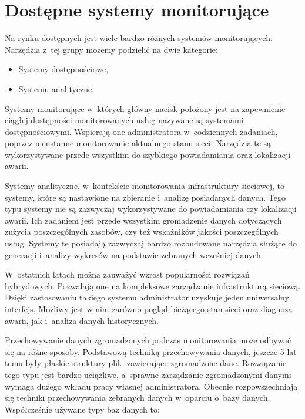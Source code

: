\chapter{Dostępne systemy monitorujące}
\label{chap:Systemy}

Na rynku dostępnych jest wiele bardzo różnych systemów
monitorujących. Narzędzia z~tej grupy możemy podzielić na dwie
kategorie:

\begin{itemize}
\item Systemy dostępnościowe,
\item Systemu analityczne.
\end{itemize}

Systemy monitorujące w~których główny nacisk położony jest na
zapewnienie ciągłej dostępności monitorowanych usług nazywane są
systemami dostępnościowymi. Wspierają one administratora
w~codziennych zadaniach, poprzez nieustanne monitorowanie aktualnego
stanu sieci. Narzędzia te są wykorzystywane przede wszystkim do
szybkiego powiadamiania oraz lokalizacji awarii.

Systemy analityczne, w~kontekście monitorowania infrastruktury
sieciowej, to systemy, które są nastawione na zbieranie i~analizę
posiadanych danych. Tego typu systemy nie są zazwyczaj wykorzystywane
do powiadamiania czy lokalizacji awarii. Ich zadaniem jest przede
wszystkim gromadzenie danych dotyczących zużycia poszczególnych
zasobów, czy też wskaźników jakości poszczególnych usług. Systemy te
posiadają zazwyczaj bardzo rozbudowane narzędzia służące do generacji
i~analizy wykresów na podstawie zebranych wcześniej danych.

W~ostatnich latach można zauważyć wzrost popularności rozwiązań
hybrydowych. Pozwalają one na kompleksowe zarządzanie infrastrukturą
sieciową. Dzięki zastosowaniu takiego systemu administrator uzyskuje
jeden uniwersalny interfejs. Możliwy jest w nim zarówno pogląd
bieżącego stan sieci oraz diagnoza awarii, jak i~analiza danych
historycznych.

Przechowywanie danych zgromadzonych podczas monitorowania może odbywać
się na różne sposoby. Podstawową techniką przechowywania danych,
jeszcze 5 lat temu były płaskie struktury pliki zawierające
zgromadzone dane. Rozwiązanie tego typu jest bardzo uciążliwe,
a~sprawne zarządzanie zgromadzonymi danymi wymaga dużego wkładu pracy
własnej administratora. Obecnie rozpowszechniają się techniki
przechowywania zebranych danych w~oparciu o~bazy danych. Współcześnie
używane typy baz danych to:

